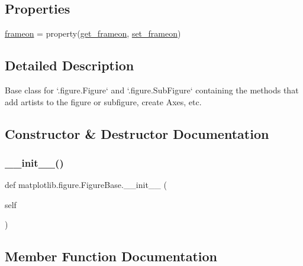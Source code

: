 \subsection*{Properties}
\begin{DoxyCompactItemize}
\item 
\hyperlink{classmatplotlib_1_1figure_1_1FigureBase_a11123dc5aa23e7190a0c4c154430c989}{frameon} = property(\hyperlink{classmatplotlib_1_1figure_1_1FigureBase_a64ada9af47f94b0121abadf8e0014cdf}{get\+\_\+frameon}, \hyperlink{classmatplotlib_1_1figure_1_1FigureBase_a81c6cabb6943f6a78bf18c53d192bd7a}{set\+\_\+frameon})
\end{DoxyCompactItemize}


\subsection{Detailed Description}
\begin{DoxyVerb}Base class for `.figure.Figure` and `.figure.SubFigure` containing the
methods that add artists to the figure or subfigure, create Axes, etc.
\end{DoxyVerb}
 

\subsection{Constructor \& Destructor Documentation}
\mbox{\label{classmatplotlib_1_1figure_1_1FigureBase_a9c1a55ea3927571cbbfe5bf3d04ade4c}} 
\subsubsection{\texorpdfstring{\+\_\+\+\_\+init\+\_\+\+\_\+()}{\_\_init\_\_()}}
{\footnotesize\ttfamily def matplotlib.\+figure.\+Figure\+Base.\+\_\+\+\_\+init\+\_\+\+\_\+ (\begin{DoxyParamCaption}\item[{}]{self }\end{DoxyParamCaption})}



\subsection{Member Function Documentation}
\mbox{\label{classmatplotlib_1_1figure_1_1FigureBase_a6bb37f960e32ed4d131f9d0230d8a15b}} 
